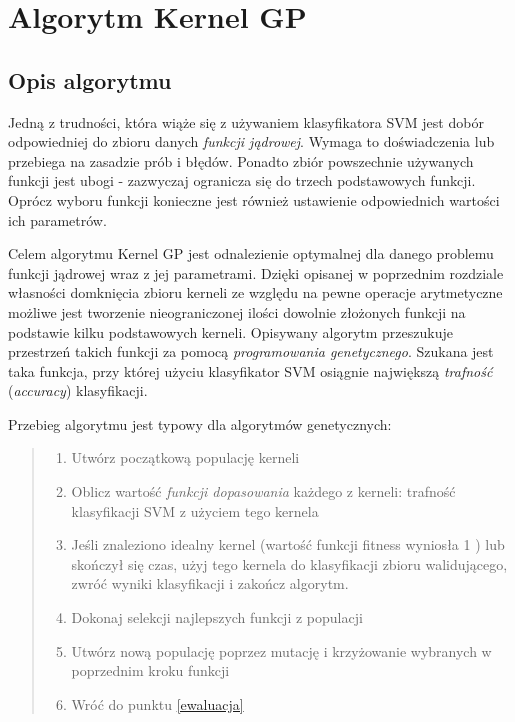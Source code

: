 \chapter{Algorytm Kernel GP}
\section{Opis algorytmu}
Jedną z trudności, która wiąże się z używaniem klasyfikatora SVM jest dobór odpowiedniej do zbioru danych \textit{funkcji jądrowej}. Wymaga to doświadczenia lub przebiega na zasadzie prób i błędów. Ponadto zbiór powszechnie używanych funkcji jest ubogi - zazwyczaj ogranicza się do trzech podstawowych funkcji. Oprócz wyboru funkcji konieczne jest również ustawienie odpowiednich wartości ich parametrów.

Celem algorytmu Kernel GP jest odnalezienie optymalnej dla danego problemu funkcji jądrowej wraz z jej parametrami. Dzięki opisanej w poprzednim rozdziale własności domknięcia zbioru kerneli ze względu na pewne operacje arytmetyczne możliwe jest tworzenie nieograniczonej ilości dowolnie złożonych funkcji na podstawie kilku podstawowych kerneli. Opisywany algorytm przeszukuje przestrzeń takich funkcji za pomocą \textit{programowania genetycznego}. Szukana jest taka funkcja, przy której użyciu klasyfikator SVM osiągnie największą \textit{trafność} (\textit{accuracy}) klasyfikacji.


Przebieg algorytmu jest typowy dla algorytmów genetycznych:
\begin{quote}
\begin{enumerate}
\item Utwórz początkową populację kerneli
\item \label{ewaluacja} Oblicz wartość \textit{funkcji dopasowania} każdego z kerneli: trafność klasyfikacji SVM z użyciem tego kernela
\item Jeśli znaleziono idealny kernel (wartość funkcji fitness wyniosła 1 ) lub skończył się czas, użyj tego kernela do klasyfikacji zbioru walidującego, zwróć wyniki klasyfikacji i zakończ algorytm.
\item Dokonaj selekcji najlepszych funkcji z populacji
\item Utwórz nową populację poprzez mutację i krzyżowanie wybranych w poprzednim kroku funkcji
\item Wróć do punktu \ref{ewaluacja}
\end{enumerate}
\end{quote}

